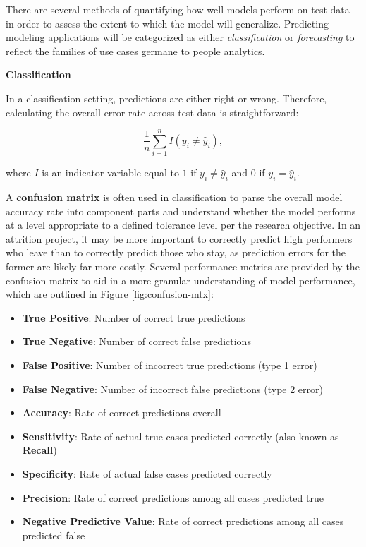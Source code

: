 \documentclass[
]{book}
\providecommand{\tightlist}{%
  \setlength{\itemsep}{0pt}\setlength{\parskip}{0pt}}
\begin{document}
There are several methods of quantifying how well models perform on test data in order to assess the extent to which the model will generalize. Predicting modeling applications will be categorized as either \emph{classification} or \emph{forecasting} to reflect the families of use cases germane to people analytics.

\textbf{Classification}

In a classification setting, predictions are either right or wrong. Therefore, calculating the overall error rate across test data is straightforward:

\[ \frac{1}{n} \displaystyle\sum_{i=1}^{n} I(y_i \ne \hat y_i), \]

where \(I\) is an indicator variable equal to \(1\) if \(y_i \ne \hat y_i\) and \(0\) if \(y_i = \hat y_i\).

A \textbf{confusion matrix} is often used in classification to parse the overall model accuracy rate into component parts and understand whether the model performs at a level appropriate to a defined tolerance level per the research objective. In an attrition project, it may be more important to correctly predict high performers who leave than to correctly predict those who stay, as prediction errors for the former are likely far more costly. Several performance metrics are provided by the confusion matrix to aid in a more granular understanding of model performance, which are outlined in Figure \ref{fig:confusion-mtx}:

\begin{itemize}
\tightlist
\item
  \textbf{True Positive}: Number of correct true predictions
\item
  \textbf{True Negative}: Number of correct false predictions
\item
  \textbf{False Positive}: Number of incorrect true predictions (type 1 error)
\item
  \textbf{False Negative}: Number of incorrect false predictions (type 2 error)
\item
  \textbf{Accuracy}: Rate of correct predictions overall
\item
  \textbf{Sensitivity}: Rate of actual true cases predicted correctly (also known as \textbf{Recall})
\item
  \textbf{Specificity}: Rate of actual false cases predicted correctly
\item
  \textbf{Precision}: Rate of correct predictions among all cases predicted true
\item
  \textbf{Negative Predictive Value}: Rate of correct predictions among all cases predicted false
\end{itemize}
\end{document}
